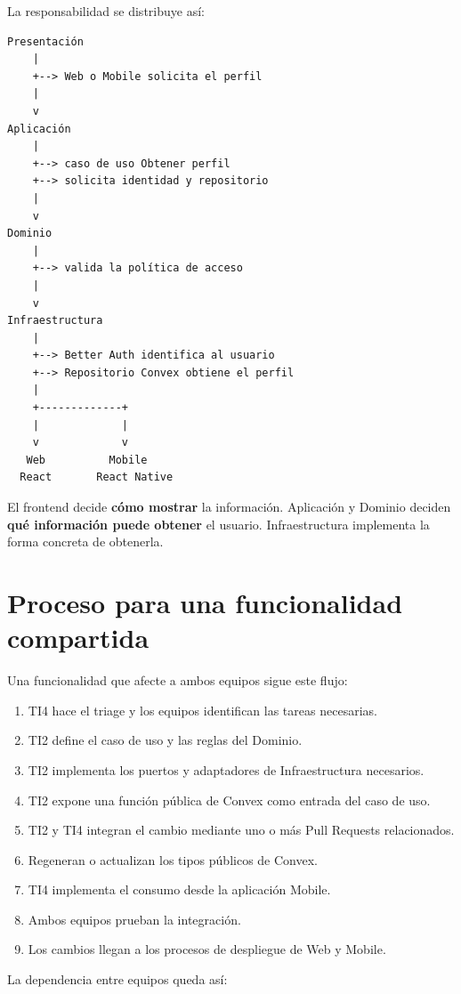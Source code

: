 \documentclass[11pt,a4paper]{article}
\begin{document}
La responsabilidad se distribuye así:

\begin{lstlisting}
Presentación
    |
    +--> Web o Mobile solicita el perfil
    |
    v
Aplicación
    |
    +--> caso de uso Obtener perfil
    +--> solicita identidad y repositorio
    |
    v
Dominio
    |
    +--> valida la política de acceso
    |
    v
Infraestructura
    |
    +--> Better Auth identifica al usuario
    +--> Repositorio Convex obtiene el perfil
    |
    +-------------+
    |             |
    v             v
   Web          Mobile
  React       React Native
\end{lstlisting}

El frontend decide \textbf{cómo mostrar} la información. Aplicación y Dominio
deciden \textbf{qué información puede obtener} el usuario. Infraestructura
implementa la forma concreta de obtenerla.

\section{Proceso para una funcionalidad compartida}

Una funcionalidad que afecte a ambos equipos sigue este flujo:

\begin{enumerate}
  \item TI4 hace el triage y los equipos identifican las tareas necesarias.
  \item TI2 define el caso de uso y las reglas del Dominio.
  \item TI2 implementa los puertos y adaptadores de Infraestructura necesarios.
  \item TI2 expone una función pública de Convex como entrada del caso de uso.
  \item TI2 y TI4 integran el cambio mediante uno o más Pull Requests
    relacionados.
  \item Regeneran o actualizan los tipos públicos de Convex.
  \item TI4 implementa el consumo desde la aplicación Mobile.
  \item Ambos equipos prueban la integración.
  \item Los cambios llegan a los procesos de despliegue de Web y Mobile.
\end{enumerate}

La dependencia entre equipos queda así:
\end{document}
